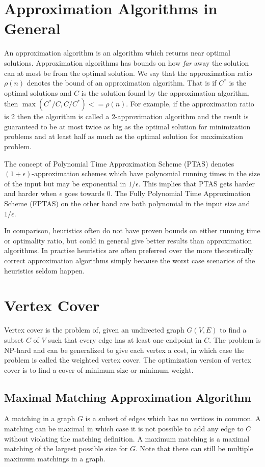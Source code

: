 \section{Approximation Algorithms in General}
An approximation algorithm is an algorithm which returns near optimal solutions. Approximation algorithms has bounds on how \textit{far} away the solution can at most be from the optimal solution. We say that the approximation ratio $\rho(n)$ denotes the bound of an approximation algorithm. That is if $C^*$ is the optimal solutions and $C$ is the solution found by the approximation algorithm, then $\max(C^*/C, C/C^*) <= \rho(n)$. For example, if the approximation ratio is 2 then the algorithm is called a 2-approximation algorithm and the result is guaranteed to be at most twice as big as the optimal solution for minimization problems and at least half as much as the optimal solution for maximization problem.

The concept of Polynomial Time Approximation Scheme (PTAS) denotes $(1+\epsilon)$-approximation schemes which have polynomial running times in the size of the input but may be exponential in $1/\epsilon$. This implies that PTAS gets harder and harder when $\epsilon$ goes towards 0. The Fully Polynomial Time Approximation Scheme (FPTAS) on the other hand are both polynomial in the input size and $1/\epsilon$. 

In comparison, heuristics often do not have proven bounds on either running time or optimality ratio, but could in general give better results than approximation algorithms. In practise heuristics are often preferred over the more theoretically correct approximation algorithms simply because the worst case scenarios of the heuristics seldom happen.

\section{Vertex Cover}
Vertex cover is the problem of, given an undirected graph $G(V,E)$ to find a subset $C$ of $V$ such that every edge has at least one endpoint in $C$. The problem is NP-hard and can be generalized to give each vertex a cost, in which case the problem is called the weighted vertex cover. The optimization version of vertex cover is to find a cover of minimum size or minimum weight.

\subsection{Maximal Matching Approximation Algorithm}
A matching in a graph $G$ is a subset of edges which has no vertices in common. A matching can be maximal in which case it is not possible to add any edge to $C$ without violating the matching definition. A maximum matching is a maximal matching of the largest possible size for $G$. Note that there can still be multiple maximum matchings in a graph. 


